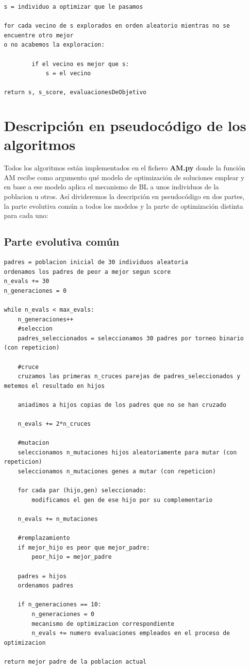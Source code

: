 \documentclass[10pt,a4paper]{article}
\begin{document}
\begin{lstlisting}
s = individuo a optimizar que le pasamos

for cada vecino de s explorados en orden aleatorio mientras no se encuentre otro mejor
o no acabemos la exploracion:
	
		if el vecino es mejor que s:
			s = el vecino		
			
return s, s_score, evaluacionesDeObjetivo
\end{lstlisting}

\newpage

\section{\color[rgb]{0.0,0.0,0.21}Descripción en pseudocódigo de los algoritmos}

Todos los algoritmos están implementados en el fichero \textbf{AM.py} donde la función AM recibe como argumento qué modelo de optimización de soluciones emplear y en base a ese modelo aplica el mecanismo de BL a unos individuos de la poblacion u otros. Así divideremos la descripción en pseudocódigo en dos partes, la parte evolutiva común a todos los modelos y la parte de optimización distinta para cada uno:\\

\subsection{\color[rgb]{0.0,0.0,0.51} Parte evolutiva común}

\begin{lstlisting}
padres = poblacion inicial de 30 individuos aleatoria
ordenamos los padres de peor a mejor segun score
n_evals += 30
n_generaciones = 0

while n_evals < max_evals:
	n_generaciones++
	#seleccion
	padres_seleccionados = seleccionamos 30 padres por torneo binario (con repeticion)
	
	#cruce
	cruzamos las primeras n_cruces parejas de padres_seleccionados y metemos el resultado en hijos
	
	aniadimos a hijos copias de los padres que no se han cruzado
	
	n_evals += 2*n_cruces
	
	#mutacion
	seleccionamos n_mutaciones hijos aleatoriamente para mutar (con repeticion)
	seleccionamos n_mutaciones genes a mutar (con repeticion)
	
	for cada par (hijo,gen) seleccionado:
		modificamos el gen de ese hijo por su complementario
		
	n_evals += n_mutaciones
		
	#remplazamiento
	if mejor_hijo es peor que mejor_padre:
		peor_hijo = mejor_padre
		
	padres = hijos
	ordenamos padres
	
	if n_generaciones == 10:
		n_generaciones = 0
		mecanismo de optimizacion correspondiente
		n_evals += numero evaluaciones empleados en el proceso de optimizacion
	
return mejor padre de la poblacion actual		
\end{lstlisting}
\end{document}
